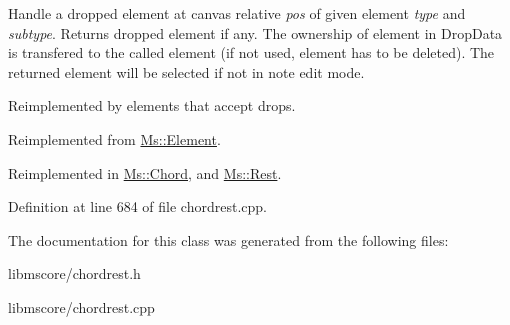 Handle a dropped element at canvas relative {\itshape pos} of given element {\itshape type} and {\itshape subtype}. Returns dropped element if any. The ownership of element in Drop\+Data is transfered to the called element (if not used, element has to be deleted). The returned element will be selected if not in note edit mode.

Reimplemented by elements that accept drops. 

Reimplemented from \hyperlink{class_ms_1_1_element_a0ca69a9fb48e7b9fb481aacaf3860032}{Ms\+::\+Element}.



Reimplemented in \hyperlink{class_ms_1_1_chord_ac91b212e92e0840f3ffd4f4751af8a39}{Ms\+::\+Chord}, and \hyperlink{class_ms_1_1_rest_a4dec6c49aaf416289c5e2f78a2074c64}{Ms\+::\+Rest}.



Definition at line 684 of file chordrest.\+cpp.



The documentation for this class was generated from the following files\+:\begin{DoxyCompactItemize}
\item 
libmscore/chordrest.\+h\item 
libmscore/chordrest.\+cpp\end{DoxyCompactItemize}
